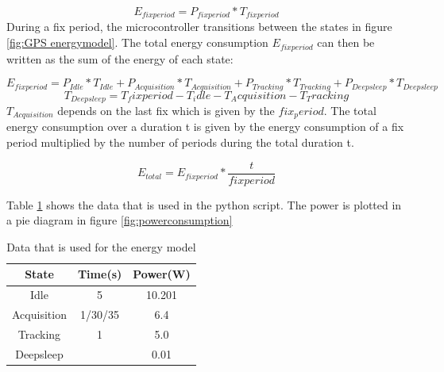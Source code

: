 \begin{equation}
E_{fixperiod} = P_{fixperiod}*T_{fixperiod}
\end{equation}
During a fix period, the microcontroller transitions between the states in figure \ref{fig:GPS energymodel}. The total energy consumption $E_{fixperiod}$ can then be written as the sum of the energy of each state:

\begin{equation}
E_{fixperiod} = P_{Idle}*T_{Idle} + P_{Acquisition}*T_{Acquisition} + P_{Tracking}*T_{Tracking} + P_{Deepsleep}*T_{Deepsleep}
\end{equation}
\begin{equation}
T_{Deepsleep} = {T_fixperiod} - {T_idle} - {T_Acquisition} - {T_Tracking}
\end{equation}
$T_ {Acquisition}$ depends on the last fix which is given by the $fix_period$.
The total energy consumption over a duration t is given by the energy consumption of a fix period multiplied by the number of periods during the total duration t.

\begin{equation}
 E_{total} = E_{fixperiod}* \frac{t}{fixperiod}
\end{equation}

Table \ref{Table:data for the energy model} shows the data that is used in the python script. The power is plotted in a pie diagram in figure \ref{fig:powerconsumption}
\begin{table}[h!]
\begin{center}
 \begin{tabular}{||c c c||} 
 \hline
  State & Time(s) & Power(W) \\ [0.5ex] 
 \hline\hline
  Idle & 5 & 10.201 \\ 
 \hline
 Acquisition & 1/30/35 & 6.4 \\
 \hline
 Tracking & 1 & 5.0 \\
 \hline
 Deepsleep &  & 0.01 \\
 [1ex]
 \hline
\end{tabular}
\end{center}
\caption{Data that is used for the energy model}
\label{Table:data for the energy model}
\end{table}

